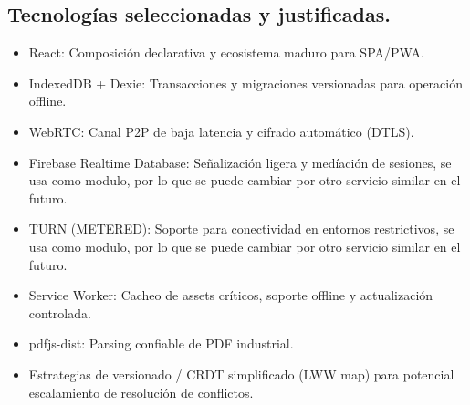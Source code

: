 \documentclass[10pt,a4paper]{report}
\begin{document}
\subsection*{Tecnologías seleccionadas y justificadas.}
\begin{itemize}
    \item React: Composición declarativa y ecosistema maduro para SPA/PWA.
    \item IndexedDB + Dexie: Transacciones y migraciones versionadas para operación offline.
    \item WebRTC: Canal P2P de baja latencia y cifrado automático (DTLS).
    \item Firebase Realtime Database: Señalización ligera y medíación de sesiones, se usa como modulo, por lo que se puede cambiar por otro servicio similar en el futuro.
    \item TURN (METERED): Soporte para conectividad en entornos restrictivos, se usa como modulo, por lo que se puede cambiar por otro servicio similar en el futuro.
    \item Service Worker: Cacheo de assets críticos, soporte offline y actualización controlada.
    \item pdfjs-dist: Parsing confiable de PDF industrial.
    \item Estrategias de versionado / CRDT simplificado (LWW map) para potencial escalamiento de resolución de conflictos.
\end{itemize}
\end{document}

